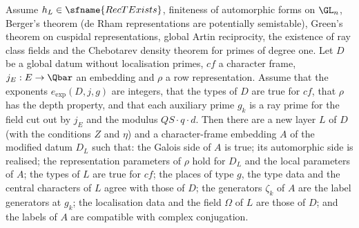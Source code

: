 \begin{proposition}\label{pf:baselat2:raytypes}
Assume $h_L\in\sfname{RecTExists}$, finiteness of automorphic forms on $\GL_n$, Berger's theorem (de Rham
representations are potentially semistable), Green's theorem on cuspidal representations, global Artin
reciprocity, the existence of ray class fields and the Chebotarev density theorem for primes of degree one.
Let $D$ be a global datum without localisation primes, $cf$ a character frame, $j_E:E\to\Qbar$ an embedding
and $\rho$ a row representation. Assume that the exponents $e_{\exp}(D,j,g)$ are integers, that the types of
$D$ are true for $cf$, that $\rho$ has the depth property, and that each auxiliary prime $g_k$ is a ray prime
for the field cut out by $j_E$ and the modulus $QS\cdot q\cdot d$. Then there are a new layer $L$ of $D$
(with the conditions $Z$ and $\eta$) and a character-frame embedding $A$ of the modified datum $D_L$ such
that: the Galois side of $A$ is true; its automorphic side is realised; the representation parameters of
$\rho$ hold for $D_L$ and the local parameters of $A$; the types of $L$ are true for $cf$; the places of type
$g$, the type data and the central characters of $L$ agree with those of $D$; the generators $\zeta_k$ of $A$
are the label generators at $g_k$; the localisation data and the field $\Omega$ of $L$ are those of $D$; and
the labels of $A$ are compatible with complex conjugation.
\end{proposition}

